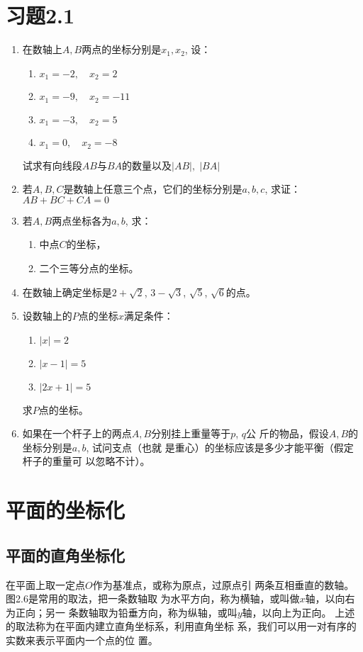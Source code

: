 \section*{习题2.1}
\begin{enumerate}
    \item 在数轴上$A,B$两点的坐标分别是$x_1,x_2$, 设：
\begin{multicols}{2}
\begin{enumerate}
    \item $x_1=-2,\quad x_2=2$
    \item $x_1=-9,\quad x_2=-11$
    \item $x_1=-3,\quad x_2=5$
    \item $x_1=0,\quad x_2=-8$
\end{enumerate}
\end{multicols}
试求有向线段$AB$与$BA$的数量以及$|AB|,\; |BA|$

\item 若$A,B,C$是数轴上任意三个点，它们的坐标分别是$a,
b,c$, 求证：$AB+BC+CA=0$
\item 若$A,B$两点坐标各为$a,b$, 求：
\begin{enumerate}
    \item 中点$C$的坐标，
    \item 二个三等分点的坐标。
\end{enumerate}

\item 
在数轴上确定坐标是$2+\sqrt{2}$, $3-\sqrt{3}$, $\sqrt{5}$, $\sqrt{6}$的点。
\item 
设数轴上的$P$点的坐标$x$满足条件：
\begin{enumerate}
    \item $|x|=2$
    \item $|x-1|=5$
    \item $|2x+1|=5$
\end{enumerate}
求$P$点的坐标。
\item 如果在一个杆子上的两点$A,B$分别挂上重量等于$p$, $q$公
斤的物品，假设$A,B$的坐标分别是$a,b$, 试问支点（也就
是重心）的坐标应该是多少才能平衡（假定杆子的重量可
以忽略不计）。


\end{enumerate}

\section{平面的坐标化}

\subsection{平面的直角坐标化}
在平面上取一定点$O$作为基准点，或称为原点，过原点引
两条互相垂直的数轴。图2.6是常用的取法，把一条数轴取
为水平方向，称为横轴，或叫做$x$轴，以向右为正向；另一
条数轴取为铅垂方向，称为纵轴，或叫$y$轴，以向上为正向。
上述的取法称为在平面内建立直角坐标系，利用直角坐标
系，我们可以用一对有序的实数来表示平面内一个点的位
置。

